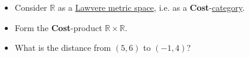 \begin{itemize}
    \item  Consider $\mathbb{R}$ as a \hyperref[D2.53]{Lawvere metric space}, i.e. as a \textbf{Cost}-\hyperref[D2.46]{category}.
    \item Form the \textbf{Cost}-product $\mathbb{R}\times\mathbb{R}$.
    \item What is the distance from $(5,6)$ to $(-1,4)$?
  \end{itemize}